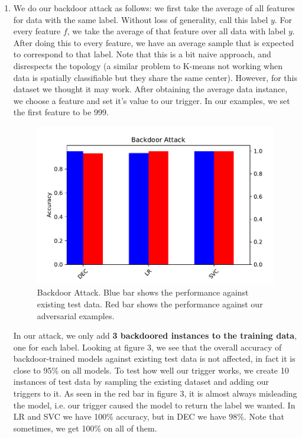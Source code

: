 \documentclass[12pt,reqno]{amsart}
\begin{document}
\begin{enumerate}[label=(\alph*)]
\item  We do our backdoor attack as follows: we first take the average of all features for data with the same label. Without loss of generality, call this label $y$. For every feature $f$, we take the average of that feature over all data with label $y$. After doing this to every feature, we have an average sample that is expected to correspond to that label. Note that this is a bit naive approach, and disrespects the topology (a similar problem to K-means not working when data is spatially classifiable but they share the same center). However, for this dataset we thought it may work. After obtaining the average data instance, we choose a feature and set it's value to our trigger. In our examples, we set the first feature to be 999. 
\begin{figure}[ht!]
 	\label{fig:backdoor}
 	\includegraphics[width=0.8\linewidth]{backdoor.pdf}
 	\caption{Backdoor Attack. Blue bar shows the performance against existing test data. Red bar shows the performance against our adversarial examples.}
\end{figure}
In our attack, we only add \textbf{3 backdoored instances to the training data}, one for each label. Looking at figure 3, we see that the overall accuracy of backdoor-trained models against existing test data is not affected, in fact it is close to 95\% on all models. To test how well our trigger works, we create 10 instances of test data by sampling the existing dataset and adding our triggers to it. As seen in the red bar in figure 3, it is almost always misleading the model, i.e. our trigger caused the model to return the label we wanted. In LR and SVC we have 100\% accuracy, but in DEC we have 98\%. Note that sometimes, we get 100\% on all of them.


\end{enumerate}
\end{document}
